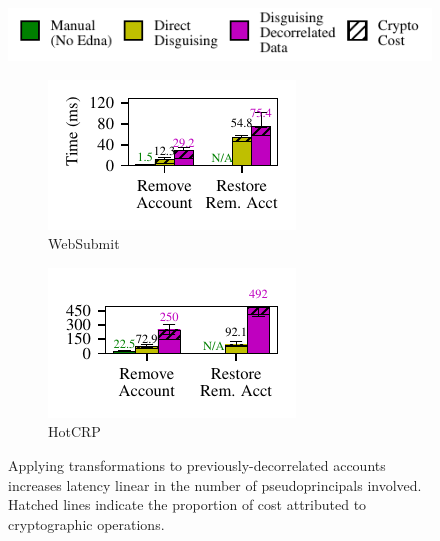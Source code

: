 \begin{figure}[h]
    \centering
    \includegraphics[width=\columnwidth]{figs/composition_legend}
    \begin{subfigure}[b]{.48\columnwidth}
        \includegraphics[width=\columnwidth]{figs/composition_stats_websubmit}
        \caption{WebSubmit}
        \label{f:comp-websubmit}
      \end{subfigure}
      \begin{subfigure}[b]{.48\columnwidth}
          \includegraphics[width=\columnwidth]{figs/composition_stats_hotcrp}
          \caption{HotCRP}
        \label{f:comp-hotcrp}
      \end{subfigure}
    \caption{Applying \xxing transformations to previously-decorrelated accounts
      increases latency linear in the number of pseudoprincipals involved.
      Hatched lines indicate the proportion of cost attributed to
      cryptographic operations.}
    \label{f:composition}
\end{figure}

